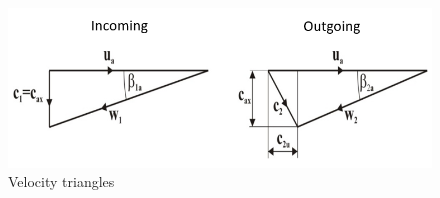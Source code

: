 \begin{figure}[ht]
\begin{center}
\includegraphics[scale=0.6]{figs/problem_2p2p16_vel_tri_fig.png}
\caption{\label{gen_vtr}Velocity triangles}
\end{center}
\end{figure}

